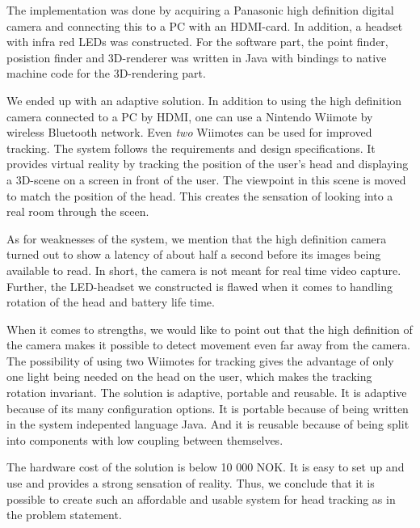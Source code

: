 The implementation was done by acquiring a Panasonic high definition digital camera and connecting this to a PC with an HDMI-card. In addition, a headset with infra red LEDs was constructed. For the software part, the point finder, posistion finder and 3D-renderer was written in Java with bindings to native machine code for the 3D-rendering part.

We ended up with an adaptive solution. In addition to using the high definition camera connected to a PC by HDMI, one can use a Nintendo Wiimote by wireless Bluetooth network. Even {\em two} Wiimotes can be used for improved tracking. The system follows the requirements and design specifications. It provides virtual reality by tracking the position of the user's head and displaying a 3D-scene on a screen in front of the user. The viewpoint in this scene is moved to match the position of the head. This creates the sensation of looking into a real room through the sceen.

As for weaknesses of the system, we mention that the high definition camera turned out to show a latency of about half a second before its images being available to read. In short, the camera is not meant for real time video capture. Further, the LED-headset we constructed is flawed when it comes to handling rotation of the head and battery life time.

When it comes to strengths, we would like to point out that the high definition of the camera makes it possible to detect movement even far away from the camera. The possibility of using two Wiimotes for tracking gives the advantage of only one light being needed on the head on the user, which makes the tracking rotation invariant. The solution is adaptive, portable and reusable. It is adaptive because of its many configuration options. It is portable because of being written in the system indepented language Java. And it is reusable because of being split into components with low coupling between themselves.

The hardware cost of the solution is below 10 000 NOK. It is easy to set up and use and provides a strong sensation of reality. Thus, we conclude that it is possible to create such an affordable and usable system for head tracking as in the problem statement.